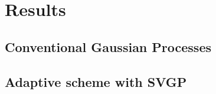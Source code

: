 \section{Results}

\subsection{Conventional Gaussian Processes}


\subsection{Adaptive scheme with SVGP}


\clearpage
